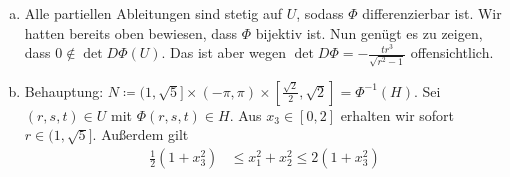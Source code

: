 \documentclass{article}
\begin{document}
\begin{enumerate}[(a)]
\begin{proof}
            Wir haben also sogar noch mehr gezeigt als nötig: Für jedes Tripel $(a,b,c) \in M$ existiert genau ein Tripel $(r,s,t) \in U$ mit $\Phi(r,s,t) = (a,b,c)$. Damit ist $\Phi\colon U \to M$ bijektiv.
        \end{proof}
        Behauptung: $\det D\Phi = -\frac{tr^3}{\sqrt{r^2 - 1}}$.
        \begin{proof}
            \begin{align*}
                \det D\Phi &= \det \begin{pmatrix}
                    \frac{\partial \Phi_1}{\partial r} & \frac{\partial \Phi_2}{\partial r} & \frac{\partial \Phi_3}{\partial r}\\[0.3em]
                    \frac{\partial \Phi_1}{\partial s} & \frac{\partial \Phi_2}{\partial s} & \frac{\partial \Phi_3}{\partial s}\\[0.3em]
                    \frac{\partial \Phi_1}{\partial t} & \frac{\partial \Phi_2}{\partial t} & \frac{\partial \Phi_3}{\partial t}
                \end{pmatrix}\\
                &= \det \begin{pmatrix}
                    t \cos(s) & t \sin(s) & \frac{r}{\sqrt{r^2-1}}\\
                    -rt \sin(s) & rt \cos(s) & 0\\
                    r \cos(t) & r\sin(s) & 0
                \end{pmatrix}\\
                &= \frac{r}{\sqrt{r^2 - 1}} \cdot t \cdot r^2 \cdot (-\sin^2(s) - \cos^2(s))\\
                &= -\frac{tr^3}{\sqrt{r^2 - 1}}
            \end{align*}
        \end{proof}
        \item Alle partiellen Ableitungen sind stetig auf $U$, sodass $\Phi$ differenzierbar ist. Wir hatten bereits oben bewiesen, dass $\Phi$ bijektiv ist. Nun genügt es zu zeigen, dass $0 \notin \det D\Phi(U)$. Das ist aber wegen $\det D\Phi = -\frac{tr^3}{\sqrt{r^2 - 1}}$ offensichtlich.
        \item Behauptung: $N \coloneqq (1, \sqrt{5}] \times (-\pi, \pi) \times [\frac{\sqrt{2}}{2}, \sqrt{2}] = \Phi^{-1}(H)$.
        Sei $(r,s,t) \in U$ mit $\Phi(r,s,t) \in H$. Aus $x_3 \in [0,2]$ erhalten wir sofort $r \in (1, \sqrt{5}]$. Außerdem gilt
        \begin{align*}
            \frac{1}{2}(1 + x_3^2) &\leq x_1^2 + x_2^2 \leq 2(1 + x_3^2)\\

\end{align*}
\end{enumerate}
\end{document}
